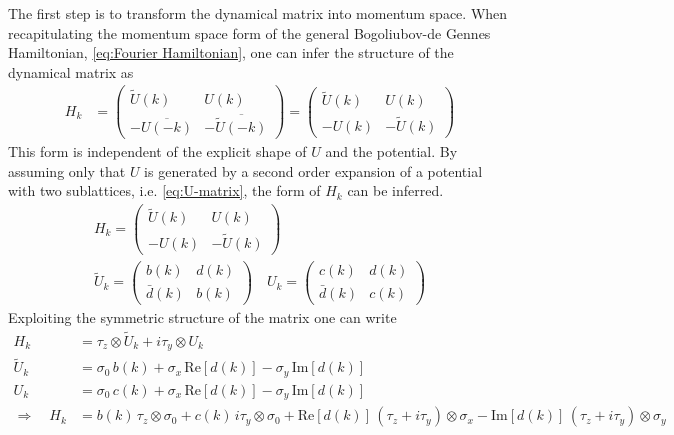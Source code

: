 The first step is to transform the dynamical matrix into momentum space. When recapitulating the momentum space form of the general Bogoliubov-de Gennes Hamiltonian, \eqref{eq:Fourier Hamiltonian}, one can infer the structure of the dynamical matrix as
\begin{align*}
   H_k&=\begin{pmatrix}
        \tilde{U}(k) & U(k)\\
       - \overline{U(-k) }& -\overline{\tilde{U}(-k)}
    \end{pmatrix} =\begin{pmatrix}
        \tilde{U}(k) & U(k)\\
       - {U(k) }& -{\tilde{U}(k)}
    \end{pmatrix} 
\end{align*}
This form is independent of the explicit shape of $U$ and the potential. By assuming only that $U$ is generated by a second order expansion of a potential with two sublattices, i.e. \eqref{eq:U-matrix}, the form of $H_k$ can be inferred.
\begin{gather*}
    H_k = \begin{pmatrix}
        \tilde{U}(k) & U(k)\\
       - {U(k) }& -{\tilde{U}(k)}
    \end{pmatrix} \\
    \tilde{U}_k = \begin{pmatrix}
        b(k) & d(k)\\
        \bar{d}(k)& b(k)
    \end{pmatrix}\quad U_k = \begin{pmatrix}
        c(k) & d(k)\\
        \bar{d}(k) & c(k)
    \end{pmatrix}
\end{gather*}
Exploiting the symmetric structure of the matrix one can write
\begin{align*}
    H_k &= \tau_z \otimes \tilde{U}_k + i\tau_y \otimes U_k\\
    \tilde{U}_k &=  \sigma_0\,b(k)  + \sigma_x\,\text{Re}[d(k)] -\sigma_y\,\text{Im}[d(k)]\\
    U_k &=  \sigma_0\,c(k)  + \sigma_x\,\text{Re}[d(k)] -\sigma_y\,\text{Im}[d(k)]\\
    \Rightarrow\quad H_k &= b(k)\,\tau_z \otimes \sigma_0 + c(k)\,i\tau_y \otimes \sigma_0 + \text{Re}[d(k)]\,(\tau_z+i\tau_y) \otimes \sigma_x - \text{Im}[d(k)]\,(\tau_z+i\tau_y) \otimes \sigma_y
\end{align*}
